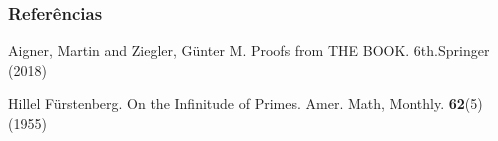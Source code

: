 \documentclass[10pt]{beamer}
\begin{document}
\begin{frame}[allowframebreaks]
\frametitle{Refer\^{e}ncias}
\footnotesize
\begin{thebibliography}{20}
%


  Aigner, Martin and  Ziegler, G\"{u}nter M. Proofs from THE BOOK.
  6th.Springer (2018)


  Hillel F\"urstenberg. On the Infinitude of Primes.
  Amer. Math, Monthly.
  \textbf{62}(5) (1955)







               

  



\end{thebibliography}
\end{frame}
\end{document}
